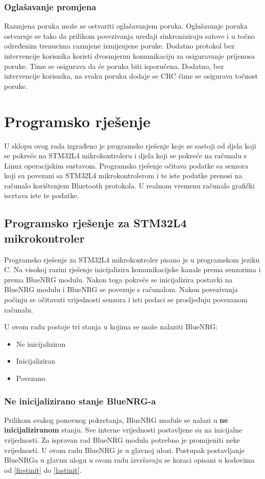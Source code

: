 \documentclass[times, utf8, diplomski]{diplomski}
\begin{document}
\subsection {Oglašavanje promjena}
Razmjena poruka može se ostvariti oglašavanjem poruka. Oglašavanje poruka ostvaruje se tako da prilikom povezivanja uređaji sinkroniziraju satove i u točno određenim trenucima razmjene izmijenjene poruke. Dodatno protokol bez intervencije korisnika koristi dvosmjernu komunikaciju za osiguravanje prijenosa poruke. Time se osigurava da će poruka biti isporučena. Dodatno, bez intervencije korisnika, na svaku poruku dodaje se CRC čime se osigurava točnost poruke.

\chapter{Programsko rješenje}
U sklopu ovog rada izgrađeno je programsko rješenje koje se sastoji od djela koji se pokreće na STM32L4 mikrokontroleru i djela koji se pokreće na računalu s Linux operacijskim sustavom.
Programsko rješenje očitava podatke sa senzora koji su povezani sa STM32L4 mikrokontrolerom i te iste podatke prenosi na računalo korištenjem Bluetooth protokola.
U realnom vremenu računalo grafički iscrtava iste te podatke.

\section{Programsko rješenje za STM32L4 mikrokontroler}
Programsko rješenje za STM32L4 mikrokontroler pisano je u programskom jeziku C.
Na visokoj razini rješenje inicijalizira komunikacijske kanale prema senzorima i prema BlueNRG modulu.
Nakon toga pokreče se inicijalizira postavki na BlueNRG modulu i BlueNRG se povezuje s računalom.
Nakon povezivanja počinju se očitavati vrijednosti senzora i isti podaci se prosljeđuju povezanom računalu.

U ovom radu postoje tri stanja u kojima se može nalaziti BlueNRG:

\begin{itemize}
  \item Ne inicijaliziran
  \item Inicijaliziran
  \item Povezano
\end{itemize}

\subsection{Ne inicijalizirano stanje BlueNRG-a}
Prilikom svakog ponovnog pokretanja, BlueNRG module se nalazi u \textbf{ne inicijaliziranom} stanju. Sve interne vrijednosti postavljene su na inicijalne vrijednosti. Za ispravan rad BlueNRG modula potrebno je promijeniti neke vrijednosti. U ovom radu BlueNRG je u glavnoj ulozi. Postupak postavljanje BlueNRGa u glavnu ulogu u ovom radu izvršavaju se koraci opisani u kodovima od \ref{firstinit} do \ref{lastinit}.
\end{document}
